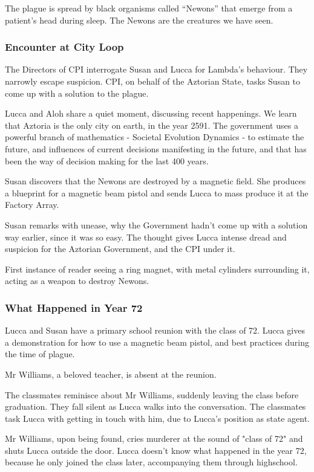 \documentclass[11pt]{article}
\begin{document}
		The plague is spread by black organisms called “Newons” that emerge from a patient’s head during sleep. The Newons are the creatures we have seen.

		\subsubsection{Encounter at City Loop}
		The Directors of CPI interrogate Susan and Lucca for Lambda’s behaviour. 
		They narrowly escape suspicion. 
		CPI, on behalf of the Aztorian State, tasks Susan to come up with a solution to the plague. 
		
		Lucca and Aloh share a quiet moment, discussing recent happenings. 
		We learn that Aztoria is the only city on earth, in the year 2591. 
		The government uses a powerful branch of mathematics - Societal Evolution Dynamics - to estimate the future, and influences of current decisions manifesting in the future, and that has been the way of decision making for the last 400 years.
		
		Susan discovers that the Newons are destroyed by a magnetic field. 
		She produces a blueprint for a magnetic beam pistol and sends Lucca to mass produce it at the Factory Array. 
		
		Susan remarks with unease, why the Government hadn’t come up with a solution way earlier, since it was so easy. 
		The thought gives Lucca intense dread and suspicion for the Aztorian Government, and the CPI under it.
		
		First instance of reader seeing a ring magnet, with metal cylinders surrounding it, acting as a weapon to destroy Newons.
		
		\subsubsection{What Happened in Year 72}
		Lucca and Susan have a primary school reunion with the class of 72. Lucca gives a demonstration for how to use a magnetic beam pistol, and best practices during the time of plague.
		
		Mr Williams, a beloved teacher, is absent at the reunion.
		
		The classmates reminisce about Mr Williams, suddenly leaving the class before graduation. They fall silent as Lucca walks into the conversation.
		The classmates task Lucca with getting in touch with him, due to Lucca's position as state agent.
		
		Mr Williams, upon being found, cries murderer at the sound of "class of 72" and shuts Lucca outside the door. 
		Lucca doesn't know what happened in the year 72, because he only joined the class later, accompanying them through highschool.		
		
\end{document}
